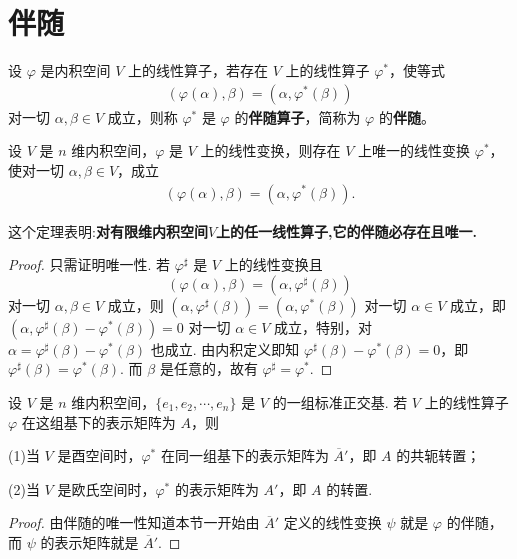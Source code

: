 \documentclass[../../main.tex]{subfiles}
\begin{document}
\section{伴随}

\begin{definition}[伴随]
设 $\varphi$ 是内积空间 $V$ 上的线性算子，若存在 $V$ 上的线性算子 $\varphi^*$，使等式
\begin{align*}
(\varphi(\alpha),\beta) = (\alpha,\varphi^*(\beta))
\end{align*}
对一切 $\alpha,\beta \in V$ 成立，则称 $\varphi^*$ 是 $\varphi$ 的\textbf{伴随算子}，简称为 $\varphi$ 的\textbf{伴随}。
\end{definition}

\begin{theorem}
设 $V$ 是 $n$ 维内积空间，$\varphi$ 是 $V$ 上的线性变换，则存在 $V$ 上唯一的线性变换 $\varphi^*$，使对一切 $\alpha,\beta \in V$，成立
\begin{align*}
(\varphi(\alpha),\beta) = (\alpha,\varphi^*(\beta)).
\end{align*}
\end{theorem}
\begin{note}
这个定理表明:\textbf{对有限维内积空间$V$上的任一线性算子,它的伴随必存在且唯一.}
\end{note}
\begin{proof}
只需证明唯一性. 若 $\varphi^{\sharp}$ 是 $V$ 上的线性变换且
\[
(\varphi(\alpha),\beta) = (\alpha,\varphi^{\sharp}(\beta))
\]
对一切 $\alpha,\beta \in V$ 成立，则 $(\alpha,\varphi^{\sharp}(\beta)) = (\alpha,\varphi^*(\beta))$ 对一切 $\alpha \in V$ 成立，即 $(\alpha,\varphi^{\sharp}(\beta) - \varphi^*(\beta)) = 0$ 对一切 $\alpha \in V$ 成立，特别，对 $\alpha = \varphi^{\sharp}(\beta) - \varphi^*(\beta)$ 也成立. 由内积定义即知 $\varphi^{\sharp}(\beta) - \varphi^*(\beta) = 0$，即 $\varphi^{\sharp}(\beta) = \varphi^*(\beta)$. 而 $\beta$ 是任意的，故有 $\varphi^{\sharp} = \varphi^*$.

\end{proof}

\begin{theorem}\label{theorem:伴随算子的矩阵}
设 $V$ 是 $n$ 维内积空间，$\{e_1,e_2,\cdots,e_n\}$ 是 $V$ 的一组标准正交基. 若 $V$ 上的线性算子 $\varphi$ 在这组基下的表示矩阵为 $A$，则

(1)当 $V$ 是酉空间时，$\varphi^*$ 在同一组基下的表示矩阵为 $\overline{A}'$，即 $A$ 的共轭转置；

(2)当 $V$ 是欧氏空间时，$\varphi^*$ 的表示矩阵为 $A'$，即 $A$ 的转置.
\end{theorem}
\begin{proof}
由伴随的唯一性知道本节一开始由 $\overline{A}'$ 定义的线性变换 $\psi$ 就是 $\varphi$ 的伴随，而 $\psi$ 的表示矩阵就是 $\overline{A}'$. 

\end{proof}
\end{document}
